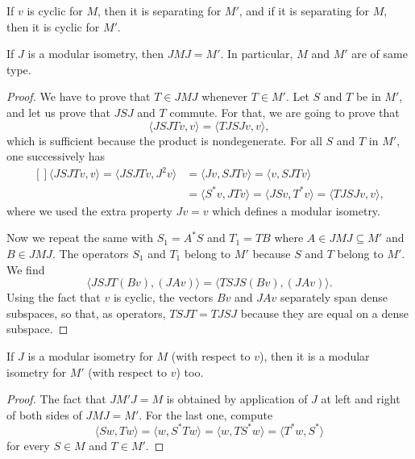 \begin{lemma}
	If $v$ is cyclic for $M$, then it is separating for $M'$, and if it is separating for $M$, then it is cyclic for $M'$.
\end{lemma}


\begin{proposition}
	If $J$ is a modular isometry, then $JMJ=M'$. In particular, $M$ and $M'$ are of same type.
\end{proposition}

\begin{proof}
	We have to prove that $T\in JMJ$ whenever $T\in M'$. Let $S$ and $T$ be in $M'$, and let us prove that $JSJ$ and $T$ commute. For that, we are going to prove that
	\begin{equation}
		\langle JSJTv, v\rangle =\langle TJSJv, v\rangle,
	\end{equation}
	which is sufficient because the product is nondegenerate. For all $S$ and $T$ in $M'$, one successively has
	\begin{equation}
	\begin{aligned}[]
		\langle JSJTv, v\rangle =\langle JSJTv, J^2v\rangle	&=\langle Jv, SJTv\rangle =\langle v, SJTv\rangle\\
									& =\langle S^*v, JTv\rangle =\langle JSv, T^*v\rangle=\langle TJSJv, v\rangle,
	\end{aligned}
\end{equation}
	where we used the extra property $Jv=v$ which defines a modular isometry.

	Now we repeat the same with $S_1=A^*S$ and $T_1=TB$ where $A\in JMJ\subseteq M'$ and $B\in JMJ$. The operators $S_1$ and $T_1$ belong to $M'$ because $S$ and $T$ belong to $M'$. We find
	\begin{equation}
		\langle JSJT(Bv), (JAv)\rangle =\langle TSJS(Bv), (JAv)\rangle.
	\end{equation}
	Using the fact that $v$ is cyclic, the vectors $Bv$ and $JAv$ separately span dense subspaces, so that, as operators, $TSJT=TJSJ$ because they are equal on a dense subspace.
\end{proof}


\begin{proposition}
	If $J$ is a modular isometry for $M$ (with respect to $v$), then it is a modular isometry for $M'$ (with respect to $v$) too.
\end{proposition}

\begin{proof}
	The fact that $JM'J=M$ is obtained by application of $J$ at left and right of both sides of $JMJ=M'$. For the last one, compute
	\begin{equation}
		\langle Sw, Tw\rangle =\langle w, S^*Tw\rangle =\langle w, TS^*w\rangle =\langle T^*w, S^*\rangle 
	\end{equation}
	for every $S\in M$ and $T\in M'$.
\end{proof}

